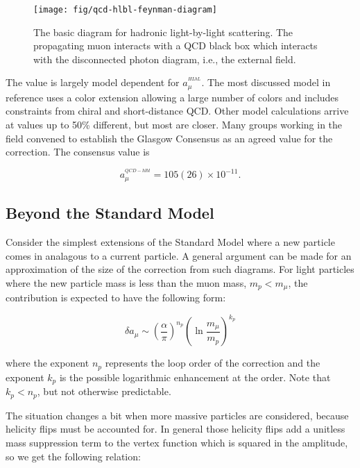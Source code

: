 \begin{figure}
\label{fig:qcd-hlbl-feynman-diagram}
\centering
\texttt{[image: fig/qcd-hlbl-feynman-diagram]}
\caption{The basic diagram for hadronic light-by-light scattering.  The propagating muon interacts with a QCD black box which interacts with the disconnected photon diagram, i.e., the external field.}
\end{figure}

The value is largely model dependent for $a_\mu^{^{HLbL}}$.  The most discussed model in reference\cite{amm-of-muon} uses a color extension allowing a large number of colors and includes constraints from chiral and short-distance QCD.  Other model calculations arrive at values up to 50\% different, but most are closer.  Many groups working in the field convened to establish the Glasgow Consensus as an agreed value for the correction\cite{e989-tdr}.  The consensus value is

\begin{equation}
\label{eqn:qcd-hlbl-total}
a_\mu^{^{QCD-hlbl}} = 105(26) \times 10^{-11}.
\end{equation}

\subsection{Beyond the Standard Model}

Consider the simplest extensions of the Standard Model where a new particle comes in analagous to a current particle.  A general argument can be made for an approximation of the size of the correction from such diagrams\cite{the-muon-g-2}.  For light particles where the new particle mass is less than the muon mass, $m_p < m_\mu$, the contribution is expected to have the following form:

\begin{equation}
\label{eqn:bsm-general-small-m}
\delta a_\mu \sim \left(\frac{\alpha}{\pi}\right)^{n_p} \left( \ln{\frac{m_\mu}{m_p}} \right)^{k_p}
\end{equation}

\noindent
where the exponent $n_p$ represents the loop order of the correction and the exponent $k_p$ is the possible logarithmic enhancement at the order.  Note that $k_p < n_p$, but not otherwise predictable.

The situation changes a bit when more massive particles are considered, because helicity flips must be accounted for.  In general those helicity flips add a unitless mass suppression term to the vertex function which is squared in the amplitude, so we get the following relation:


